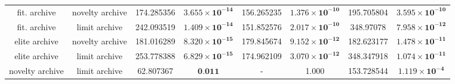 \begin{tabular}{cccccccc}
   fit. archive & novelty archive &     174.285356 & $\mathbf{3.655 \times 10^{-14}}$ &  156.265235 & $\mathbf{1.376 \times 10^{-10}}$ &  195.705804 & $\mathbf{3.595 \times 10^{-10}}$ \\
   fit. archive &   limit archive &     242.093519 & $\mathbf{1.409 \times 10^{-14}}$ &  151.852576 & $\mathbf{2.017 \times 10^{-10}}$ &   348.97078 & $\mathbf{7.958 \times 10^{-12}}$ \\
  elite archive & novelty archive &     181.016289 & $\mathbf{8.320 \times 10^{-15}}$ &  179.845674 & $\mathbf{9.152 \times 10^{-12}}$ &  182.623177 & $\mathbf{1.478 \times 10^{-11}}$ \\
  elite archive &   limit archive &     253.778388 & $\mathbf{6.829 \times 10^{-15}}$ &  174.962109 & $\mathbf{3.070 \times 10^{-12}}$ &  348.347918 & $\mathbf{1.074 \times 10^{-11}}$ \\
novelty archive &   limit archive &      62.807367 &                 $\textbf{0.011}$ &           - &                            1.000 &  153.728544 &  $\mathbf{1.119 \times 10^{-4}}$ \\
\bottomrule
\end{tabular}
